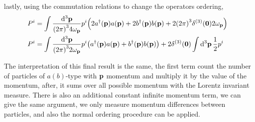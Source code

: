 lastly, using the commutation relations to change the operators ordering,
\begin{align}
    P^i&=\int\frac{\dd[3]{\vb p}}{\qty(2\pi)^34\omega_{\vb p}}p^i\qty(2a^\dagger\qty(\vb p)a\qty(\vb p)+2b^\dagger\qty(\vb p)b\qty(\vb p)+2\qty(2\pi)^3\delta^{\qty(3)}\qty(\vb 0)2\omega_{\vb p})\\
    P^i&=\int\frac{\dd[3]{\vb p}}{\qty(2\pi)^32\omega_{\vb p}}p^i\qty(a^\dagger\qty(\vb p)a\qty(\vb p)+b^\dagger\qty(\vb p)b\qty(\vb p))+2\delta^{\qty(3)}\qty(\vb 0)\int\dd[3]{\vb p}\frac12p^i
\end{align}

The interpretation of this final result is the same, the first term count the number of particles of $a(b)$-type with $\vb p$ momentum and multiply it by the value of the momentum, after, it sums over all possible momentum 
with the Lorentz invariant measure. There is also an additional constant infinite momentum term, we can give the same argument, we only measure momentum differences between particles, and also the normal ordering procedure 
can be applied.

